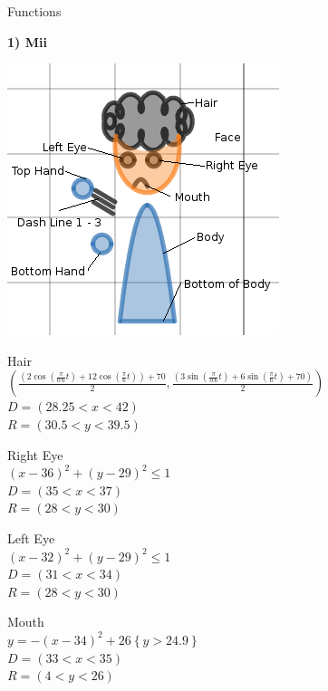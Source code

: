 \documentclass[12pt]{article}
\begin{document}
\begin{center}
\begin{LARGE}
	Functions\\
\end{LARGE}
\begin{large}
\textbf{1) Mii}\\
\end{large}
\includegraphics{mii}

{

Hair\\
$\left(\frac{\left(2\cos\left(\frac{\pi}{0.6}t\right)+12\cos\left(\frac{\pi}{6}t\right)\right)+70}{2},\frac{\left(3\sin\left(\frac{\pi}{0.6}t\right)+6\sin\left(\frac{\pi}{6}t\right)+70\right)}{2}\right)$\\
$D = (28.25 < x < 42)$\\
$R = (30.5 < y < 39.5)$\\
\bigbreak

Right Eye\\
$\left(x-36\right)^2+\left(y-29\right)^2\le1$\\
$D = (35 < x < 37)$\\
$R = (28 < y < 30)$\\
\bigbreak

Left Eye\\
$\left(x-32\right)^2+\left(y-29\right)^2\le1$\\
$D = (31 < x <  34)$\\
$R = (28 < y <  30)$\\
\bigbreak

\clearpage
Mouth\\
$y=-\left(x-34\right)^2+26\left\{y>24.9\right\}$\\
$D = (33 < x < 35)$\\
$R = (4 < y < 26)$\\
\bigbreak

}
\end{center}
\end{document}
